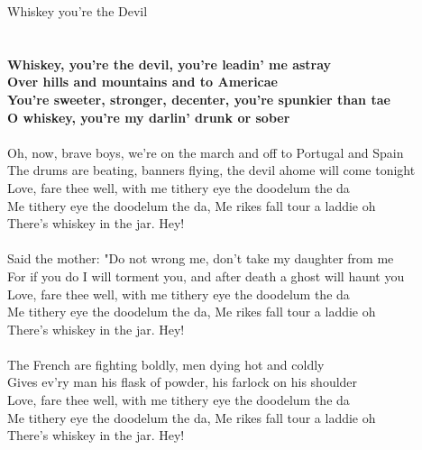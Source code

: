 \documentclass[letterpaper,9pt]{article}
\begin{document}
\newpage
{}
\huge
Whiskey you're the Devil\\
\\
\LARGE
\\\textbf{Whiskey, you're the devil, you're leadin' me astray
\\Over hills and mountains and to Americae
\\You're sweeter, stronger, decenter, you're spunkier than tae
\\O whiskey, you're my darlin' drunk or sober}
\\
\\Oh, now, brave boys, we're on the march and off to Portugal and Spain
\\The drums are beating, banners flying, the devil ahome will come tonight
\\Love, fare thee well, with me tithery eye the doodelum the da
\\Me tithery eye the doodelum the da, Me rikes fall tour a laddie oh
\\There's whiskey in the jar. Hey!
\\
\\Said the mother: "Do not wrong me, don't take my daughter from me
\\For if you do I will torment you, and after death a ghost will haunt you
\\Love, fare thee well, with me tithery eye the doodelum the da
\\Me tithery eye the doodelum the da, Me rikes fall tour a laddie oh
\\There's whiskey in the jar. Hey!
\\
\\The French are fighting boldly, men dying hot and coldly
\\Gives ev'ry man his flask of powder, his farlock on his shoulder
\\Love, fare thee well, with me tithery eye the doodelum the da
\\Me tithery eye the doodelum the da, Me rikes fall tour a laddie oh
\\There's whiskey in the jar. Hey!
\end{document}
